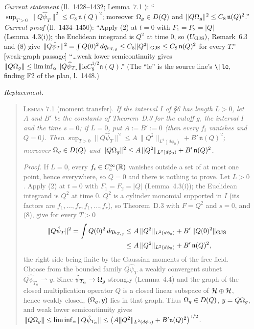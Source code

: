 \emph{Current statement} (ll.~1428--1432; Lemma~7.1 \cite[p.~20]{R}):
``$\sup_{T>0}\|Q\hat\psi_T\|^2\le C_8\,\mathfrak n(Q)^2$; moreover $\Omega_g\in D(Q)$ and
$\|Q\Omega_g\|^2\le C_8\,\mathfrak n(Q)^2$.''
\emph{Current proof} (ll.~1434--1450): ``Apply (2) at $t=0$ with $F_1=F_2=|Q|$ (Lemma~4.3(i)); the
Euclidean integrand is $Q^2$ at time $0$, so $(U_{\rm GJS})$, Remark~6.3 and (8) give
$\|Q\hat\psi_T\|^2=\int Q(0)^2\,dq_{h_{T,g}}\le C_8\|Q^2\|_{\rm GJS}\le C_8\,\mathfrak n(Q)^2$ for
every $T$.'' [weak-graph passage] ``\dots weak lower semicontinuity gives
$\|Q\Omega_g\|\le\liminf_\alpha\|Q\widehat\psi_{T_\alpha}\|$le$C_8^{1/2}\mathfrak n(Q)$.''  (The
``le'' is the source line's \verb+\|le+, finding F2 of the plan, l.~1448.)

\emph{Replacement.}
\begin{quote}\small
\textsc{Lemma 7.1} (moment transfer).  \emph{If the interval $I$ of \S6 has length $L>0$, let $A$
and $B'$ be the constants of Theorem~D.3 for the cutoff $g$, the interval $I$ and the time $s=0$;
if $L=0$, put $A:=B':=0$ (then every $f_i$ vanishes and $Q=0$).  Then
$\sup_{T>0}\|Q\hat\psi_T\|^2\le A\,\|Q^2\|_{L^2(d\phi_0)}+B'\,\mathfrak n(Q)^2$; moreover
$\Omega_g\in D(Q)$ and $\|Q\Omega_g\|^2\le A\,\|Q^2\|_{L^2(d\phi_0)}+B'\,\mathfrak n(Q)^2$.}

\emph{Proof.}  If $L=0$, every $f_i\in C_c^\infty(\mathbb{R})$ vanishes outside a set of at most one
point, hence everywhere, so $Q=0$ and there is nothing to prove.  Let $L>0$.  Apply (2) at $t=0$
with $F_1=F_2=|Q|$ (Lemma~4.3(i)); the Euclidean integrand is $Q^2$ at time $0$.  $Q^2$ is a
cylinder monomial supported in $I$ (its factors are $f_1,\dots,f_r,f_1,\dots,f_r$), so
Theorem~D.3 with $F=Q^2$ and $s=0$, and (8), give for every $T>0$
\begin{align*}
 \|Q\hat\psi_T\|^2=\int Q(0)^2\,dq_{h_{T,g}}
 &\le A\,\|Q^2\|_{L^2(d\phi_0)}+B'\,\|Q(0)^2\|_{\rm GJS}\\
 &\le A\,\|Q^2\|_{L^2(d\phi_0)}+B'\,\mathfrak n(Q)^2 ,
\end{align*}
the right side being finite by the Gaussian moments of the free field.  Choose from the bounded
family $Q\hat\psi_T$ a weakly convergent subnet $Q\hat\psi_{T_\alpha}\rightharpoonup y$.  Since
$\hat\psi_{T_\alpha}\to\Omega_g$ strongly (Lemma~4.4) and the graph of the closed multiplication
operator $Q$ is a closed linear subspace of $\mathcal{H}\oplus\mathcal{H}$, hence weakly closed, $(\Omega_g,y)$ lies
in that graph.  Thus $\Omega_g\in D(Q)$, $y=Q\Omega_g$, and weak lower semicontinuity gives
$\|Q\Omega_g\|\le\liminf_\alpha\|Q\hat\psi_{T_\alpha}\|\le\bigl(A\|Q^2\|_{L^2(d\phi_0)}+
B'\mathfrak n(Q)^2\bigr)^{1/2}$.
\end{quote}
